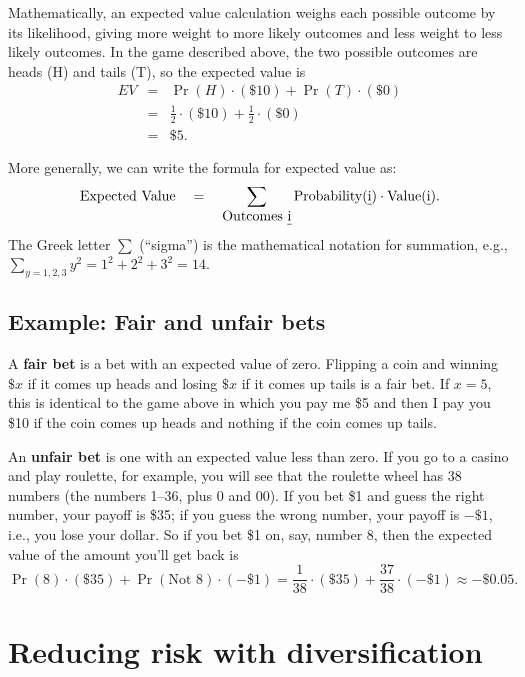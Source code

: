 Mathematically, an expected value calculation weighs each possible outcome by its likelihood, giving more weight to more likely outcomes and less weight to less likely outcomes. In the game described above, the two possible outcomes are heads (H) and tails (T), so the expected value is
\begin{eqnarray*}
EV & = & \Pr(H) \cdot (\$10) + \Pr(T) \cdot (\$0) \\
& = & \frac{1}{2}\cdot (\$10) + \frac{1}{2} \cdot (\$0) \\
& = & \$5.
\end{eqnarray*}

More generally, we can write the formula for expected value as:
\[
\mbox{Expected Value}\ \ \  = \ \ \ \sum_{\mbox{Outcomes
\emph{i}}} \mbox{Probability(\emph{i})} \cdot
\mbox{Value(\emph{i})}.
\]
The Greek letter $\sum$ (``sigma'') is the mathematical notation for summation, e.g., $\displaystyle \sum_{y=1,2,3} y^2 = 1^2+2^2+3^2 = 14$.


\subsection*{Example: Fair and unfair bets}

A \textbf{fair bet} is a bet with an expected value of zero. Flipping a coin and winning $\$x$ if it comes up heads and losing $\$x$ if it comes up tails is a fair bet. If $x=5$, this is identical to the game above in which you pay me \$5 and then I pay you \$10 if the coin comes up heads and nothing if the coin comes up tails.

An \textbf{unfair bet} is one with an expected value less than zero. If you go to a casino and play roulette, for example, you will see that the roulette wheel has 38 numbers (the numbers 1--36, plus 0 and 00). If you bet \$1 and guess the right number, your payoff is \$35; if you guess the wrong number, your payoff is $-\$1$, i.e., you lose your dollar. So if you bet \$1 on, say, number 8, then the expected value of the amount you'll get back is
\[
\Pr(8) \cdot (\$35) + \Pr(\mbox{Not $8$}) \cdot (-\$1) = \frac{1}{38}
\cdot (\$35) + \frac{37}{38} \cdot (-\$1) \approx -\$0.05.
\]
%



\section{Reducing risk with diversification}\label{diversification}

